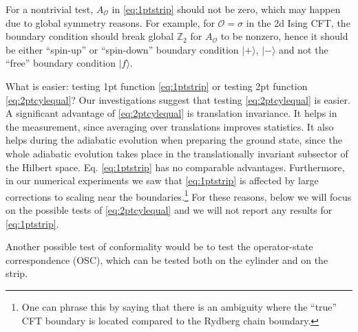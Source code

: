 \documentclass[a4paper,12pt]{article}
\theoremstyle{remark}
\theoremstyle{theorem}
\begin{document}
For a nontrivial test, $A_{\mathcal{O}}$ in \eqref{eq:1ptstrip} should not be
zero, which may happen due to global symmetry reasons. For example, for
$\mathcal{O}= \sigma$ in the 2d Ising CFT, the boundary condition should break
global $\mathbb{Z}_2$ for $A_{\mathcal{O}}$ to be nonzero, hence it should be
either ``spin-up'' or ``spin-down'' boundary condition $| + \rangle$, $| -
\rangle$ and not the ``free'' boundary condition $|f \rangle$.

What is easier: testing 1pt function \eqref{eq:1ptstrip} or testing 2pt
function \eqref{eq:2ptcylequal}? Our investigations suggest that testing
\eqref{eq:2ptcylequal} is easier. A significant advantage of
\eqref{eq:2ptcylequal} is translation invariance. It helps in the measurement,
since averaging over translations improves statistics. It also helps during
the adiabatic evolution when preparing the ground state, since the whole
adiabatic evolution takes place in the translationally invariant subsector of
the Hilbert space. Eq. \eqref{eq:1ptstrip} has no comparable advantages.
Furthermore, in our numerical experiments we saw that \eqref{eq:1ptstrip} is affected by
large corrections to scaling near the boundaries.\footnote{One can phrase this
	by saying that there is an ambiguity where the ``true'' CFT boundary is
	located compared to the Rydberg chain boundary.} For these reasons, below we
will focus on the possible tests of \eqref{eq:2ptcylequal} and we will not
report any results for \eqref{eq:1ptstrip}.

 Another possible test of conformality would be to test
the operator-state correspondence (OSC), which can be tested both on the
cylinder and on the strip.
\end{document}
